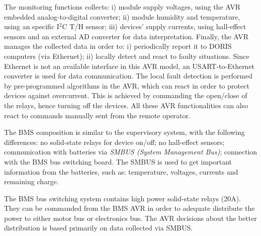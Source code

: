 \documentclass{ifacconf}
\begin{document}
The monitoring functions collects: i) module supply voltages, using the AVR embedded analog-to-digital converter; ii) module humidity and temperature, using an specific I$^{2}$C T/H sensor; iii) devices' supply currents, using hall-effect sensors and an external AD converter for data interpretation. Finally, the AVR manages the collected data in order to: i) periodically report it to DORIS computers (via Ethernet); ii) locally detect and react to faulty situations. Since Ethernet is not an available interface in this AVR model, an USART-to-Ethernet converter is used for data communication. The local fault detection is performed by pre-programmed algorithms in the AVR, which can react in order to protect devices against overcurrent. This is achieved by commanding the open/close of the relays, hence turning off the devices. All these AVR functionalities can also react to commands manually sent from the remote operator.

The BMS composition is similar to the supervisory system, with the following
differences: no solid-state relays for device on/off; no hall-effect sensors;
communication with batteries via \emph{SMBUS (System Management Bus)};
connection with the BMS bus switching board. The SMBUS is used to get important
information from the batteries, such as: temperature, voltages, currents and
remaining charge.

The BMS bus switching system contains high power solid-state relays (20A). They
can be commanded from the BMS AVR in order to adequate distribute the power to
either motor bus or electronics bus. The AVR decisions about the better
distribution is based primarily on data collected via SMBUS.

\end{document}
